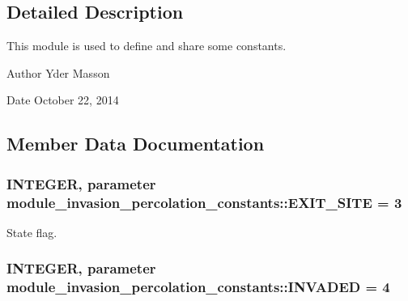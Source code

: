 \subsection{\-Detailed \-Description}
\-This module is used to define and share some constants. 

\begin{DoxyAuthor}{\-Author}
\-Yder \-Masson 
\end{DoxyAuthor}
\begin{DoxyDate}{\-Date}
\-October 22, 2014 
\end{DoxyDate}


\subsection{\-Member \-Data \-Documentation}
\hypertarget{classmodule__invasion__percolation__constants_a91f942526d67d154ae5ec76baccbf12e}{
\subsubsection[{\-E\-X\-I\-T\-\_\-\-S\-I\-T\-E}]{\setlength{\rightskip}{0pt plus 5cm}\-I\-N\-T\-E\-G\-E\-R, parameter {\bf module\-\_\-invasion\-\_\-percolation\-\_\-constants\-::\-E\-X\-I\-T\-\_\-\-S\-I\-T\-E} = 3}}
\label{classmodule__invasion__percolation__constants_a91f942526d67d154ae5ec76baccbf12e}


\-State flag. 

\hypertarget{classmodule__invasion__percolation__constants_a60e99c2c35344e991e5955bf347d2516}{
\subsubsection[{\-I\-N\-V\-A\-D\-E\-D}]{\setlength{\rightskip}{0pt plus 5cm}\-I\-N\-T\-E\-G\-E\-R, parameter {\bf module\-\_\-invasion\-\_\-percolation\-\_\-constants\-::\-I\-N\-V\-A\-D\-E\-D} = 4}}
\label{classmodule__invasion__percolation__constants_a60e99c2c35344e991e5955bf347d2516}


